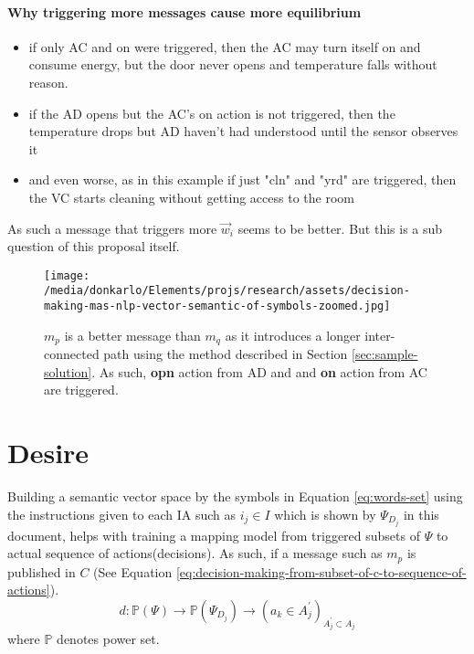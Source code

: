 \documentclass{article}
\begin{document}
\begin{multicols}{2}
			\paragraph{Why triggering more messages cause more equilibrium}
			\begin{itemize}
				\item if only AC and on were triggered, then the AC may turn itself on and consume energy, but the door never opens and temperature falls without reason. 
				\item if the AD opens but the AC's on action is not triggered, then the temperature drops but AD haven't had understood until the sensor observes it
				\item and even worse, as in this example if just "cln" and "yrd" are triggered, then the VC starts cleaning without getting access to the room
			\end{itemize} 
			As such a message that triggers more $\vec{w}_i$ seems to be better. But this is a sub question of this proposal itself. 
			\begin{figure*}
				\centering
				\texttt{[image: /media/donkarlo/Elements/projs/research/assets/decision-making-mas-nlp-vector-semantic-of-symbols-zoomed.jpg]}
				\caption{$m_p$ is a better message than $m_q$ as it introduces a longer inter-connected path using the method described in Section \ref{sec:sample-solution}. As such, \textbf{opn} action from AD and and \textbf{on} action from AC are triggered.}
				\label{fig:decision-making-mas-nlp-vector-semantic-of-symbols-zoomed}
			\end{figure*}
			
	\section{Desire}\label{sec:desire}
		Building a semantic vector space by the symbols in Equation \ref{eq:words-set} using the instructions given to each IA such as $i_j \in I$ which is shown by $\Psi_{D_j}$ in this document, helps with training a mapping model from triggered subsets of $\Psi$ to actual sequence of actions(decisions). As such, if a message such as $m_p$ is published in $C$ (See Equation \ref{eq:decision-making-from-subset-of-c-to-sequence-of-actions}).   
		\begin{equation}
			d:\mathbb{P}(\Psi) \rightarrow \mathbb{P}(\Psi_{D_j}) \rightarrow (a_k \in A^{'}_j)_{A^{'}_j \subset A_j}
			\label{eq:decision-making-from-subset-of-c-to-sequence-of-actions}
		\end{equation}
		where $\mathbb{P}$ denotes power set. 

\end{multicols}
\end{document}

